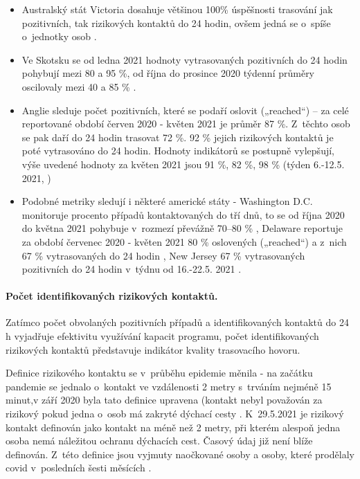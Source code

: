 \begin{itemize}
\item Australský stát Victoria dosahuje většinou 100\% úspěšnosti trasování jak pozitivních, tak rizikových kontaktů do 24 hodin, ovšem jedná se o~spíše o~jednotky osob \cite{tr_victoria}.
\item Ve Skotsku se od ledna 2021 hodnoty vytrasovaných pozitivních do 24 hodin pohybují mezi 80 a 95 \%, od října do prosince 2020 týdenní průměry oscilovaly mezi 40 a 85 \% \cite{tr_scotland}.
\item Anglie sleduje počet pozitivních, které se podaří oslovit („reached“) -- za celé reportované období červen 2020 - květen 2021 je průměr 87 \%. Z~těchto osob se pak daří do 24 hodin trasovat 72 \%. 92 \% jejich rizikových kontaktů je poté vytrasováno do 24 hodin. Hodnoty indikátorů se postupně vylepšují, výše uvedené hodnoty za květen 2021 jsou 91 \%, 82 \%, 98 \% (týden 6.-12.5. 2021, \cite{tr_gov_uk})
\item Podobné metriky sledují i některé americké státy - Washington D.C. monitoruje procento případů kontaktovaných do tří dnů, to se od října 2020 do května 2021 pohybuje v~rozmezí převážně 70--80 \% \cite{tr_DC}, Delaware reportuje za období červenec 2020 - květen 2021 80 \% oslovených („reached“) a z~nich 67 \% vytrasovaných do 24 hodin \cite{tr_Delaware}, New Jersey 67 \% vytrasovaných pozitivních do 24 hodin v~týdnu od 16.-22.5. 2021 \cite{tr_NewJersey}.
\end{itemize}


\paragraph{Počet identifikovaných rizikových kontaktů.} Zatímco počet obvolaných pozitivních případů a identifikovaných kontaktů do 24 h vyjadřuje efektivitu využívání kapacit programu, počet identifikovaných rizikových kontaktů představuje indikátor kvality trasovacího hovoru.

Definice rizikového kontaktu se v~průběhu epidemie měnila - na začátku pandemie se jednalo o~kontakt ve vzdálenosti 2 metry s~trváním nejméně 15 minut,v září 2020 byla tato definice upravena (kontakt nebyl považován za rizikový pokud jedna o~osob má zakryté dýchací cesty \cite{tr_MZCR}. K~29.5.2021 je rizikový kontakt definován jako kontakt na méně než 2 metry, při kterém alespoň jedna osoba nemá náležitou ochranu dýchacích cest. Časový údaj již není blíže definován. Z~této definice jsou vyjmuty naočkované osoby a osoby, které prodělaly covid v~posledních šesti měsících \cite{tr_covidgov}.

